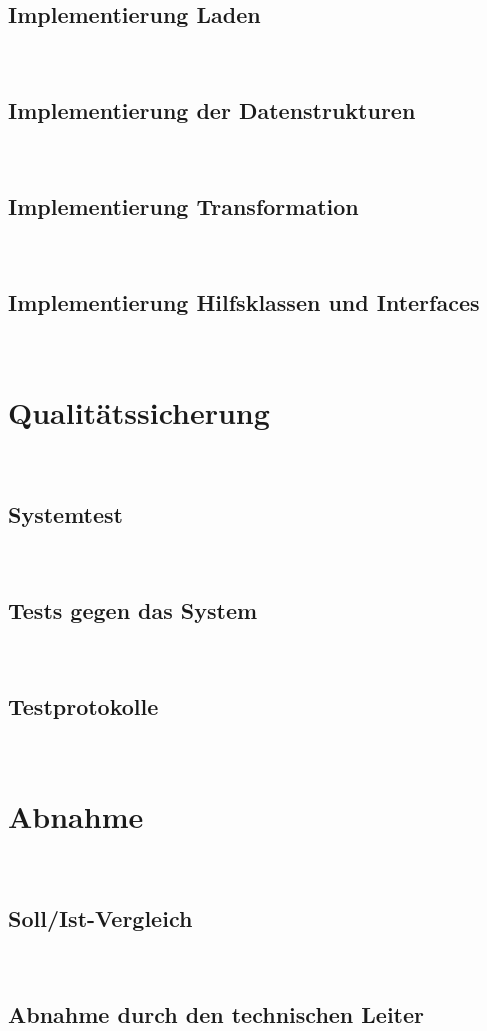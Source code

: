 \documentclass[11pt,toc=sectionentrywithoutdots, 
headheight=44pt, headings=optiontoheadandtoc, hyperfootnotes=false, hypertexnames=false]{scrartcl}
\begin{document}
\subsection{Implementierung Laden}
\blindtext\

\subsection{Implementierung der Datenstrukturen}
\blindtext\

\subsection{Implementierung Transformation}
\blindtext\

\subsection{Implementierung Hilfsklassen und Interfaces}
\blindtext\

\section{Qualitätssicherung}
\blindtext\

\subsection{Systemtest}
\blindtext\

\subsection{Tests gegen das System}
\blindtext\

\subsection{Testprotokolle}
\blindtext\

\section{Abnahme}
\blindtext\

\subsection{Soll/Ist-Vergleich}
\blindtext\

\subsection{Abnahme durch den technischen Leiter}
\blindtext\
\end{document}
